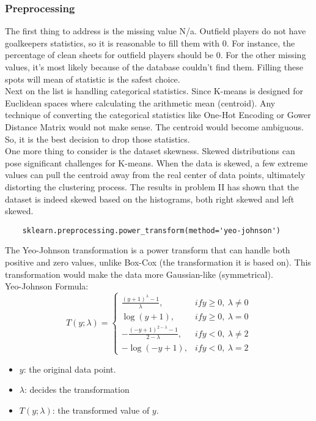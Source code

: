 \documentclass{report}
\begin{document}
\subsubsection{Preprocessing}
The first thing to address is the missing value N/a. Outfield players do not have goalkeepers statistics, 
so it is reasonable to fill them with 0. For instance, the percentage of clean sheets for outfield players 
should be 0. For the other missing values, it's most likely because of the database couldn't find them. 
Filling these spots will mean of statistic is the safest choice.\\

\noindent Next on the list is handling categorical statistics. Since K-means is designed for Euclidean spaces where 
calculating the arithmetic mean (centroid). Any technique of converting the categorical
statistics like One-Hot Encoding or Gower Distance Matrix would not make sense. The centroid would 
become ambiguous. So, it is the best decision to drop those statistics. \\

\noindent One more thing to consider is the dataset skewness. Skewed distributions can pose significant 
challenges for K-means. When the data is skewed, a few extreme values can pull the centroid away from 
the real center of data points, ultimately distorting the clustering process. The results in problem II
has shown that the dataset is indeed skewed based on the histograms, both right skewed and left skewed.
\begin{verbatim}
    sklearn.preprocessing.power_transform(method='yeo-johnson')
\end{verbatim}
The Yeo-Johnson transformation is a power transform that can handle both positive and zero values, 
unlike Box-Cox (the transformation it is based on). This transformation would make the data more 
Gaussian-like (symmetrical). \\
Yeo-Johnson Formula: 
\[ %
T(y; \lambda) =
\left\{
\begin{array}{ll}
\frac{(y + 1)^\lambda - 1}{\lambda}, & if y \geq 0,\ \lambda \ne 0 \\[6pt]
\log(y + 1), & if y \geq 0,\ \lambda = 0 \\[6pt]
- \frac{(-y + 1)^{2 - \lambda} - 1}{2 - \lambda}, & if y < 0,\ \lambda \ne 2 \\[6pt]
- \log(-y + 1), & if y < 0,\ \lambda = 2
\end{array}
\right.
\]
\begin{itemize}
    \item \( y \): the original data point.
    \item \( \lambda \): decides the transformation
    \item \( T(y; \lambda) \): the transformed value of \( y \).
\end{itemize}
\end{document}
